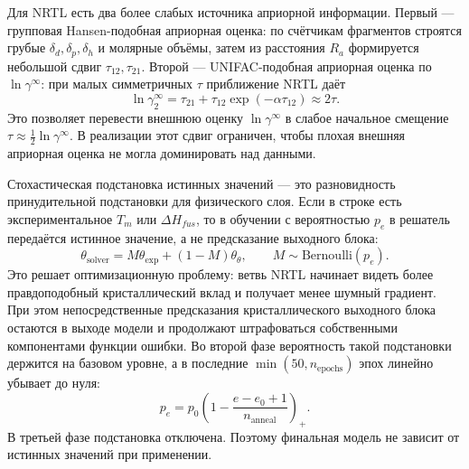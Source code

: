 \documentclass[11pt]{article}
\theoremstyle{definition}
\begin{document}
Для NRTL есть два более слабых источника априорной информации. Первый --- групповая Hansen-подобная априорная оценка: по счётчикам фрагментов строятся грубые $\delta_d,\delta_p,\delta_h$ и молярные объёмы, затем из расстояния $R_a$ формируется небольшой сдвиг $\tau_{12},\tau_{21}$. Второй --- UNIFAC-подобная априорная оценка по $\ln\gamma^\infty$: при малых симметричных $\tau$ приближение NRTL даёт
\begin{equation*}
    \ln\gamma_2^\infty
    =\tau_{21}+\tau_{12}\exp(-\alpha\tau_{12})
    \approx 2\tau.
\end{equation*}
Это позволяет перевести внешнюю оценку $\ln\gamma^\infty$ в слабое начальное смещение $\tau\approx\frac12\ln\gamma^\infty$. В реализации этот сдвиг ограничен, чтобы плохая внешняя априорная оценка не могла доминировать над данными.

Стохастическая подстановка истинных значений --- это разновидность принудительной подстановки для физического слоя. Если в строке есть экспериментальное $T_m$ или $\Delta H_{fus}$, то в обучении с вероятностью $p_e$ в решатель передаётся истинное значение, а не предсказание выходного блока:
\begin{equation*}
    \theta_{\mathrm{solver}}
    =M\theta_{\mathrm{exp}}+(1-M)\theta_\theta,
    \qquad M\sim\mathrm{Bernoulli}(p_e).
\end{equation*}
Это решает оптимизационную проблему: ветвь NRTL начинает видеть более правдоподобный кристаллический вклад и получает менее шумный градиент. При этом непосредственные предсказания кристаллического выходного блока остаются в выходе модели и продолжают штрафоваться собственными компонентами функции ошибки. Во второй фазе вероятность такой подстановки держится на базовом уровне, а в последние $\min(50,n_{\mathrm{epochs}})$ эпох линейно убывает до нуля:
\begin{equation*}
    p_e=p_0\left(1-
    \frac{e-e_0+1}{n_{\mathrm{anneal}}}
    \right)_+ .
\end{equation*}
В третьей фазе подстановка отключена. Поэтому финальная модель не зависит от истинных значений при применении.
\end{document}
